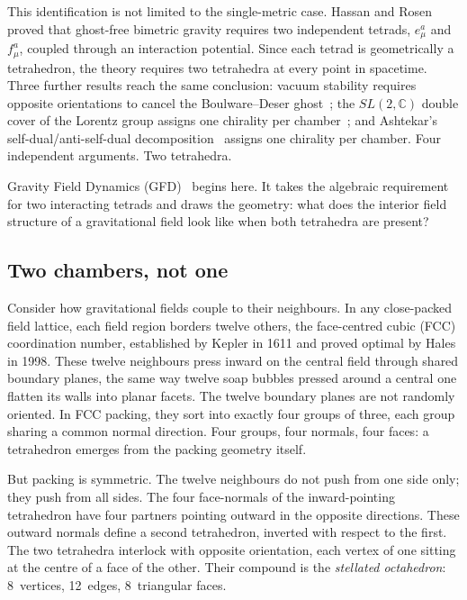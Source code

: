 \documentclass[twocolumn]{iopjournal}
\begin{document}
This identification is not limited to the single-metric case.
Hassan and Rosen~\cite{hassanrosen2012} proved that ghost-free
bimetric gravity requires two independent tetrads,
$e^{a}_{\mu}$ and $f^{a}_{\mu}$, coupled through an interaction
potential. Since each tetrad is geometrically a tetrahedron,
the theory requires two tetrahedra at every point in spacetime.
Three further results reach the same conclusion:
vacuum stability requires opposite orientations to cancel
the Boulware--Deser ghost~\cite{boulwaredeser1972};
the $SL(2,\mathbb{C})$ double cover of the Lorentz group
assigns one chirality per chamber~\cite{weinberg1995};
and Ashtekar's self-dual/anti-self-dual
decomposition~\cite{ashtekar1986} assigns one chirality per
chamber.
Four independent arguments. Two tetrahedra.

Gravity Field Dynamics (GFD)~\cite{nelson2025a} begins here.
It takes the algebraic requirement for two interacting tetrads
and draws the geometry: what does the interior field structure
of a gravitational field look like when both tetrahedra are
present?

\subsection*{Two chambers, not one}

Consider how gravitational fields couple to their neighbours.
In any close-packed field lattice, each field region borders
twelve others, the face-centred cubic (FCC) coordination
number, established by Kepler in 1611 and proved optimal by
Hales in 1998. These twelve neighbours press inward on the
central field through shared boundary planes, the same way
twelve soap bubbles pressed around a central one flatten its
walls into planar facets.
The twelve boundary planes are not randomly oriented.
In FCC packing, they sort into exactly four groups of three,
each group sharing a common normal direction.
Four groups, four normals, four faces: a tetrahedron emerges
from the packing geometry itself.

But packing is symmetric. The twelve neighbours do not push
from one side only; they push from all sides. The four
face-normals of the inward-pointing tetrahedron have four
partners pointing outward in the opposite directions.
These outward normals define a second tetrahedron, inverted
with respect to the first.
The two tetrahedra interlock with opposite orientation,
each vertex of one sitting at the centre of a face of the other.
Their compound is the \emph{stellated octahedron}:
8~vertices, 12~edges, 8~triangular faces.
\end{document}
